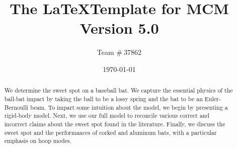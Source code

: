 \documentclass[a4paper, 12pt]{article}
\title{The \LaTeX Template for  MCM Version 5.0}
\author{Team $\#\ 37862$}
\date{\today}
\begin{document}
\begin{abstract}
We determine the sweet spot on a baseball bat. We capture the essential
physics of the ball-bat impact by taking the ball to be a lossy spring and the
bat to be an Euler-Bernoulli beam. To impart some intuition about the model,
we begin by presenting a rigid-body model. Next, we use our full model
to reconcile various correct and incorrect claims about the sweet spot found
in the literature. Finally, we discuss the sweet spot and the performances of
corked and aluminum bats, with a particular emphasis on hoop modes.

\end{abstract}

\maketitle
\pagestyle{empty}
\newpage



\end{document}
